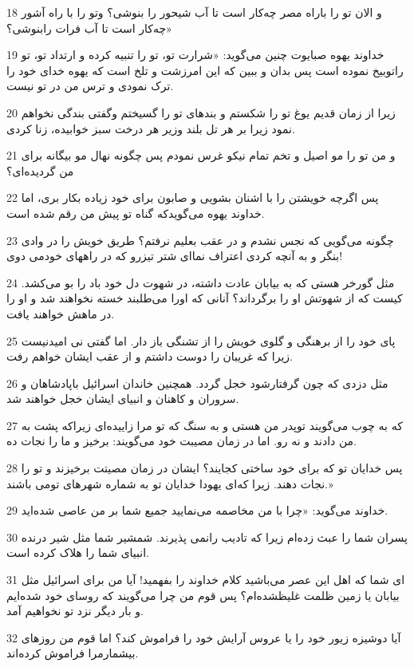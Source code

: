 \par 18 و الان تو را باراه مصر چه‌کار است تا آب شیحور را بنوشی؟ وتو را با راه آشور چه‌کار است تا آب فرات رابنوشی؟»
\par 19 خداوند یهوه صبایوت چنین می‌گوید: «شرارت تو، تو را تنبیه کرده و ارتداد تو، تو راتوبیخ نموده است پس بدان و ببین که این امرزشت و تلخ است که یهوه خدای خود را ترک نمودی و ترس من در تو نیست.
\par 20 زیرا از زمان قدیم یوغ تو را شکستم و بندهای تو را گسیختم وگفتی بندگی نخواهم نمود زیرا بر هر تل بلند وزیر هر درخت سبز خوابیده، زنا کردی.
\par 21 و من تو را مو اصیل و تخم تمام نیکو غرس نمودم پس چگونه نهال مو بیگانه برای من گردیده‌ای؟
\par 22 پس اگر‌چه خویشتن را با اشنان بشویی و صابون برای خود زیاده بکار بری، اما خداوند یهوه می‌گویدکه گناه تو پیش من رقم شده است.
\par 23 چگونه می‌گویی که نجس نشدم و در عقب بعلیم نرفتم؟ طریق خویش را در وادی بنگر و به آنچه کردی اعتراف نما‌ای شتر تیزرو که در راههای خودمی دوی!
\par 24 مثل گورخر هستی که به بیابان عادت داشته، در شهوت دل خود باد را بو می‌کشد. کیست که از شهوتش او را برگرداند؟ آنانی که اورا می‌طلبند خسته نخواهند شد و او را در ماهش خواهند یافت.
\par 25 پای خود را از برهنگی و گلوی خویش را از تشنگی باز دار. اما گفتی نی امیدنیست زیرا که غریبان را دوست داشتم و از عقب ایشان خواهم رفت.
\par 26 مثل دزدی که چون گرفتارشود خجل گردد. همچنین خاندان اسرائیل باپادشاهان و سروران و کاهنان و انبیای ایشان خجل خواهند شد.
\par 27 که به چوب می‌گویند توپدر من هستی و به سنگ که تو مرا زاییده‌ای زیراکه پشت به من دادند و نه رو. اما در زمان مصیبت خود می‌گویند: برخیز و ما را نجات ده.
\par 28 پس خدایان تو که برای خود ساختی کجایند؟ ایشان در زمان مصیتت برخیزند و تو را نجات دهند. زیرا که‌ای یهودا خدایان تو به شماره شهرهای تومی باشند.»
\par 29 خداوند می‌گوید: «چرا با من مخاصمه می‌نمایید جمیع شما بر من عاصی شده‌اید.
\par 30 پسران شما را عبث زده‌ام زیرا که تادیب رانمی پذیرند. شمشیر شما مثل شیر درنده انبیای شما را هلاک کرده است.
\par 31 ‌ای شما که اهل این عصر می‌باشید کلام خداوند را بفهمید! آیا من برای اسرائیل مثل بیابان یا زمین ظلمت غلیظشده‌ام؟ پس قوم من چرا می‌گویند که روسای خود شده‌ایم و بار دیگر نزد تو نخواهیم آمد.
\par 32 آیا دوشیزه زیور خود را یا عروس آرایش خود را فراموش کند؟ اما قوم من روزهای بیشمارمرا فراموش کرده‌اند.
